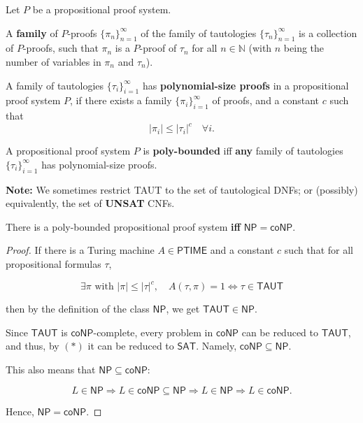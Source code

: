 Let $P$ be a propositional proof system.

A \textbf{family} of $P$-proofs $\{\pi_n\}_{n=1}^{\infty}$ of the family of tautologies $\{\tau_n\}_{n=1}^{\infty}$ is a collection of $P$-proofs, such that $\pi_n$ is a $P$-proof of $\tau_n$ for all $n \in \mathbb{N}$ (with $n$ being the number of variables in $\pi_n$ and $\tau_n$).

\begin{definition}
A family of tautologies $\{\tau_i\}_{i=1}^{\infty}$ has \textbf{polynomial-size proofs} in a propositional proof system $P$, if there exists a family $\{\pi_i\}_{i=1}^{\infty}$ of proofs, and a constant $c$ such that  
\[
|\pi_i| \leq |\tau_i|^c \quad \forall i.
\]

A propositional proof system $P$ is \textbf{poly-bounded} iff \textbf{any} family of tautologies $\{\tau_i\}_{i=1}^{\infty}$ has polynomial-size proofs.
\end{definition}

\textbf{Note:} We sometimes restrict TAUT to the set of tautological DNFs; or (possibly) equivalently, the set of \textbf{UNSAT} CNFs.

\begin{theorem}
There is a poly-bounded propositional proof system \textbf{iff} $\mathsf{NP} = \mathsf{coNP}$.
\end{theorem}

\begin{proof}
If there is a Turing machine $A \in \mathsf{PTIME}$ and a constant $c$ such that for all propositional formulas $\tau$,

\[
\exists \pi \text{ with } |\pi| \leq |\tau|^c, \quad A(\tau, \pi) = 1 \iff \tau \in \mathsf{TAUT}
\]

then by the definition of the class $\mathsf{NP}$, we get $\mathsf{TAUT} \in \mathsf{NP}$.

Since $\mathsf{TAUT}$ is $\mathsf{coNP}$-complete, every problem in $\mathsf{coNP}$ can be reduced to $\mathsf{TAUT}$, and thus, by $(*)$ it can be reduced to $\mathsf{SAT}$. Namely, $\mathsf{coNP} \subseteq \mathsf{NP}$.

This also means that $\mathsf{NP} \subseteq \mathsf{coNP}$:

\[
L \in \mathsf{NP} \Rightarrow L \in \mathsf{coNP} \subseteq \mathsf{NP} \Rightarrow L \in \mathsf{NP} \Rightarrow L \in \mathsf{coNP}.
\]

Hence, $\mathsf{NP} = \mathsf{coNP}$.
\end{proof}



